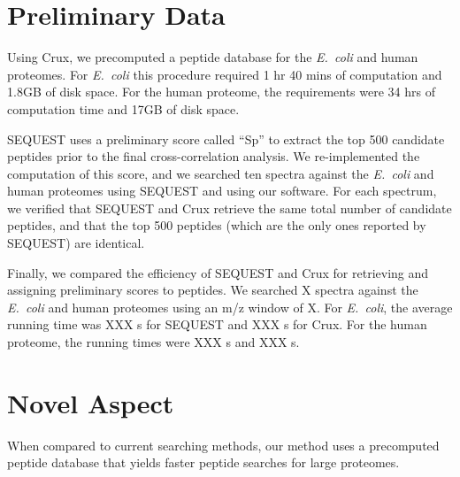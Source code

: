 \documentclass[12pt]{article}
\begin{document}
\section{Preliminary Data}

Using Crux, we precomputed a peptide database for the {\em E.\ coli}
and human proteomes.  For {\em E.\ coli} this procedure required 1 hr
40 mins of computation and 1.8GB of disk space.  For the human
proteome, the requirements were 34 hrs of computation time and 17GB of
disk space.

SEQUEST uses a preliminary score called ``Sp'' to extract the top 500
candidate peptides prior to the final cross-correlation analysis.  We
re-implemented the computation of this score, and we searched ten
spectra against the {\em E.\ coli} and human proteomes using SEQUEST
and using our software.  For each spectrum, we verified that SEQUEST
and Crux retrieve the same total number of candidate peptides, and
that the top 500 peptides (which are the only ones reported by
SEQUEST) are identical.

Finally, we compared the efficiency of SEQUEST and Crux for retrieving
and assigning preliminary scores to peptides.  We searched X spectra
against the {\em E.\ coli} and human proteomes using an m/z window of
X.  For {\em E.\ coli}, the average running time was XXX s for SEQUEST
and XXX s for Crux.  For the human proteome, the running times were
XXX s and XXX s.

\section{Novel Aspect}

When compared to current searching methods, our method uses a
precomputed peptide database that yields faster peptide searches for
large proteomes.
\end{document}
